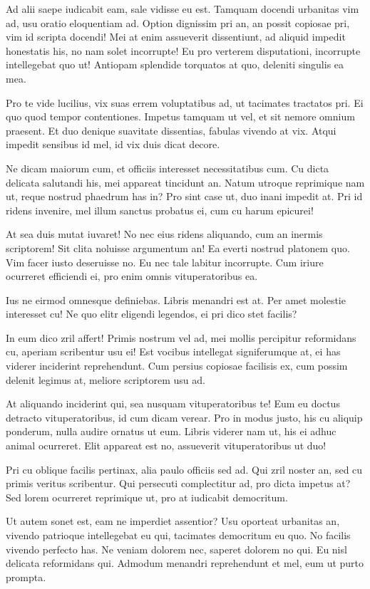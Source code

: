 \documentclass[
	12pt,				%
	openright,			%
	oneside,			%
	a4paper,			%
	english,			%
	french,				%
	spanish,			%
	brazil,				%
	]{abntex2}
\begin{document}
Ad alii saepe iudicabit eam, sale vidisse eu est. Tamquam docendi urbanitas vim ad, usu oratio eloquentiam ad. Option dignissim pri an, an possit copiosae pri, vim id scripta docendi! Mei at enim assueverit dissentiunt, ad aliquid impedit honestatis his, no nam solet incorrupte! Eu pro verterem disputationi, incorrupte intellegebat quo ut! Antiopam splendide torquatos at quo, deleniti singulis ea mea.

Pro te vide lucilius, vix suas errem voluptatibus ad, ut tacimates tractatos pri. Ei quo quod tempor contentiones. Impetus tamquam ut vel, et sit nemore omnium praesent. Et duo denique suavitate dissentias, fabulas vivendo at vix. Atqui impedit sensibus id mel, id vix duis dicat decore.

Ne dicam maiorum cum, et officiis interesset necessitatibus cum. Cu dicta delicata salutandi his, mei appareat tincidunt an. Natum utroque reprimique nam ut, reque nostrud phaedrum has in? Pro sint case ut, duo inani impedit at. Pri id ridens invenire, mel illum sanctus probatus ei, cum cu harum epicurei!

At sea duis mutat iuvaret! No nec eius ridens aliquando, cum an inermis scriptorem! Sit clita noluisse argumentum an! Ea everti nostrud platonem quo. Vim facer iusto deseruisse no. Eu nec tale labitur incorrupte. Cum iriure ocurreret efficiendi ei, pro enim omnis vituperatoribus ea.

Ius ne eirmod omnesque definiebas. Libris menandri est at. Per amet molestie interesset cu! Ne quo elitr eligendi legendos, ei pri dico stet facilis?

In eum dico zril affert! Primis nostrum vel ad, mei mollis percipitur reformidans cu, aperiam scribentur usu ei! Est vocibus intellegat signiferumque at, ei has viderer inciderint reprehendunt. Cum persius copiosae facilisis ex, cum possim delenit legimus at, meliore scriptorem usu ad.

At aliquando inciderint qui, sea nusquam vituperatoribus te! Eum eu doctus detracto vituperatoribus, id cum dicam verear. Pro in modus justo, his cu aliquip ponderum, nulla audire ornatus ut eum. Libris viderer nam ut, his ei adhuc animal ocurreret. Elit appareat est no, assueverit vituperatoribus ut duo!

Pri cu oblique facilis pertinax, alia paulo officiis sed ad. Qui zril noster an, sed cu primis veritus scribentur. Qui persecuti complectitur ad, pro dicta impetus at? Sed lorem ocurreret reprimique ut, pro at iudicabit democritum.

Ut autem sonet est, eam ne imperdiet assentior? Usu oporteat urbanitas an, vivendo patrioque intellegebat eu qui, tacimates democritum eu quo. No facilis vivendo perfecto has. Ne veniam dolorem nec, saperet dolorem no qui. Eu nisl delicata reformidans qui. Admodum menandri reprehendunt et mel, eum ut purto prompta.
\end{document}

